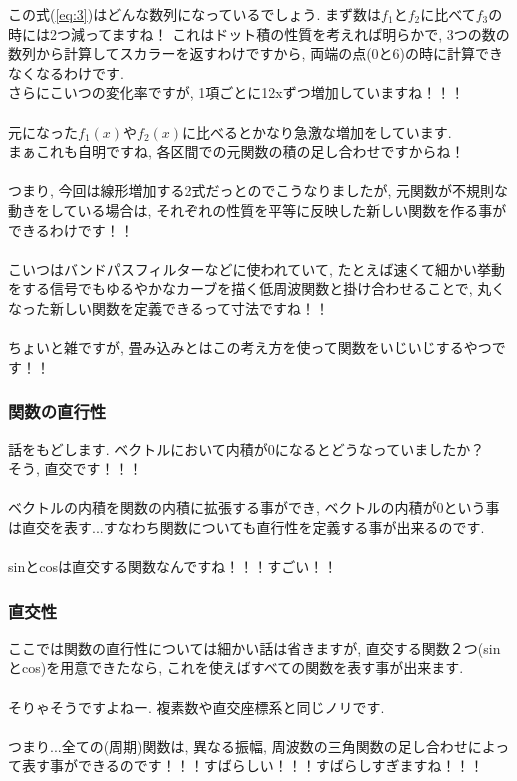 \documentclass[11pt,a4paper]{jsarticle}
\begin{document}
この式(\ref{eq:3})はどんな数列になっているでしょう. まず数は$f_1$と$f_2$に比べて$f_3$の時には2つ減ってますね！ これはドット積の性質を考えれば明らかで, 3つの数の数列から計算してスカラーを返すわけですから, 両端の点(0と6)の時に計算できなくなるわけです.\\
さらにこいつの変化率ですが, 1項ごとに12xずつ増加していますね！！！\\
\\
元になった$f_1(x)$や$f_2(x)$に比べるとかなり急激な増加をしています. \\
まぁこれも自明ですね, 各区間での元関数の積の足し合わせですからね！\\
\\
つまり, 今回は線形増加する2式だっとのでこうなりましたが, 元関数が不規則な動きをしている場合は, それぞれの性質を平等に反映した新しい関数を作る事ができるわけです！！\\
\\
こいつはバンドパスフィルターなどに使われていて, たとえば速くて細かい挙動をする信号でもゆるやかなカーブを描く低周波関数と掛け合わせることで, 丸くなった新しい関数を定義できるって寸法ですね！！\\
\\
ちょいと雑ですが, 畳み込みとはこの考え方を使って関数をいじいじするやつです！！\\
\subsubsection{関数の直行性}
話をもどします. ベクトルにおいて内積が0になるとどうなっていましたか？\\
そう, 直交です！！！\\
\\
ベクトルの内積を関数の内積に拡張する事ができ, ベクトルの内積が0という事は直交を表す...すなわち関数についても直行性を定義する事が出来るのです.\\
\\
sinとcosは直交する関数なんですね！！！すごい！！
\subsubsection{直交性}
ここでは関数の直行性については細かい話は省きますが, 直交する関数２つ(sinとcos)を用意できたなら, これを使えばすべての関数を表す事が出来ます.\\
\\
そりゃそうですよねー. 複素数や直交座標系と同じノリです.\\
\\
つまり...全ての(周期)関数は, 異なる振幅, 周波数の三角関数の足し合わせによって表す事ができるのです！！！すばらしい！！！すばらしすぎますね！！！\\
\\
\end{document}
